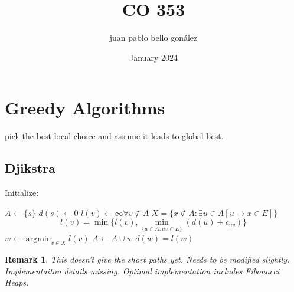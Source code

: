 \documentclass{article}
\title{CO 353}
\author{juan pablo bello gonález}
\date{January 2024}
\newtheorem*{remark}{Remark}
\DeclareMathOperator*{\argmin}{argmin} %
\begin{document}
\maketitle

\section{Greedy Algorithms}
pick the best local choice and assume it leads to global best. 

\subsection{Djikstra}


\begin{algorithm}
\caption{Djikstra}\label{alg:cap}
Initialize:
\begin{algorithmic}[1]
\State $A \gets \{s\}$ 
\State $d(s) \gets 0$ 
\State $l(v) \gets \infty \forall v \not \in A$
\State $X = \{x \not \in A : \exists u \in A  [u \rightarrow x \in E] \}$  
\[ l(v) = \min \{ l(v),  \min_{ \{u \in A : uv \in E \}} (d(u)+ c_{uv}) \} \]
\EndFor
\State $w \gets \argmin_{v \in X} l(v)$
\State $A \gets A \cup {w}$
\State $d(w) = l(w)$ 
\EndWhile
\end{algorithmic}
\end{algorithm}
\begin{remark}
This doesn't give the short paths yet. Needs to be modified slightly.
Implementaiton details missing. Optimal implementation includes Fibonacci Heaps. 
\end{remark}
\end{document}
